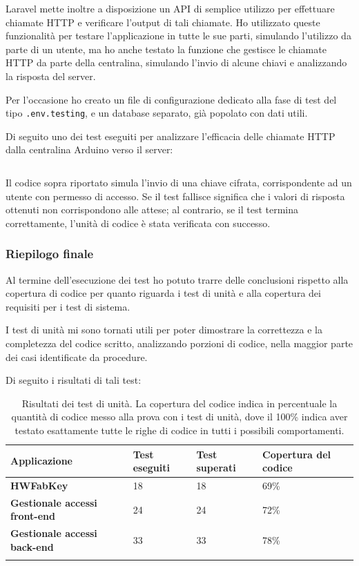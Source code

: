 Laravel mette inoltre a disposizione un API di semplice utilizzo per effettuare chiamate HTTP e verificare l'output di tali chiamate. Ho utilizzato queste funzionalità per testare l'applicazione in tutte le sue parti, simulando l'utilizzo da parte di un utente, ma ho anche testato la funzione che gestisce le chiamate HTTP da parte della centralina, simulando l'invio di alcune chiavi e analizzando la risposta del server.

\medskip

Per l'occasione ho creato un file di configurazione dedicato alla fase di test del tipo \verb|.env.testing|, e un database separato, già popolato con dati utili.

\medskip

Di seguito uno dei test eseguiti per analizzare l'efficacia delle chiamate HTTP dalla centralina Arduino verso il server:

\inputminted[bgcolor=bg, frame=lines, framesep=2mm, startinline=true, breaklines=true, fontsize=\small, linenos=true]{php}{capitoli/code.php}

Il codice sopra riportato simula l'invio di una chiave cifrata, corrispondente ad un utente con permesso di accesso. Se il test fallisce significa che i valori di risposta ottenuti non corrispondono alle attese; al contrario, se il test termina correttamente, l'unità di codice è stata verificata con successo.

\subsubsection{Riepilogo finale}
Al termine dell'esecuzione dei test ho potuto trarre delle conclusioni rispetto alla copertura di codice per quanto riguarda i test di unità e alla copertura dei requisiti per i test di sistema.

\medskip

I test di unità mi sono tornati utili per poter dimostrare la correttezza e la completezza del codice scritto, analizzando porzioni di codice, nella maggior parte dei casi identificate da procedure. 

Di seguito i risultati di tali test:

\renewcommand{\arraystretch}{1.2}
\begin{longtable}{|p{2.7cm}|l|l|p{3cm}|}
\hline
\textbf{Applicazione} & \textbf{Test eseguiti} & \textbf{Test superati} & \textbf{Copertura \linebreak del codice} \\ 
\hline
\textbf{HWFabKey} & 18 & 18 & 69\%\\ 
\hline
\textbf{Gestionale accessi front-end} & 24  & 24 & 72\%\\ 
\hline
\textbf{Gestionale accessi back-end} & 33  & 33 & 78\%\\ 
\hline
\caption{Risultati dei test di unità. La copertura del codice indica in percentuale la quantità di codice messo alla prova con i test di unità, dove il 100\% indica aver testato esattamente tutte le righe di codice in tutti i possibili comportamenti.}
\end{longtable}

